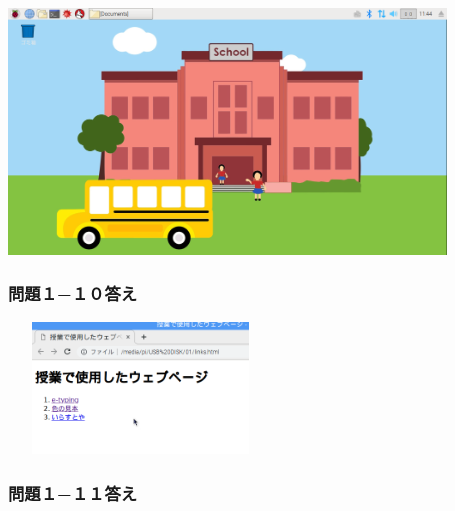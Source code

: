 \documentclass[a4paper,12pt]{jarticle}
\begin{document}
\centering
\includegraphics[width=11.621cm,height=6.533cm]{textbook-img223.png}


\flushleft
\clearpage
\begin{minipage}{\textwidth}
  \subsubsection{\bfseries
    問題１−１０答え}

  \centering
  \includegraphics[width=7.0cm,height=3.5cm]{textbook-img224.png}
  \flushleft

  \subsubsection{\bfseries
    問題１−１１答え}


\end{minipage}
\end{document}
